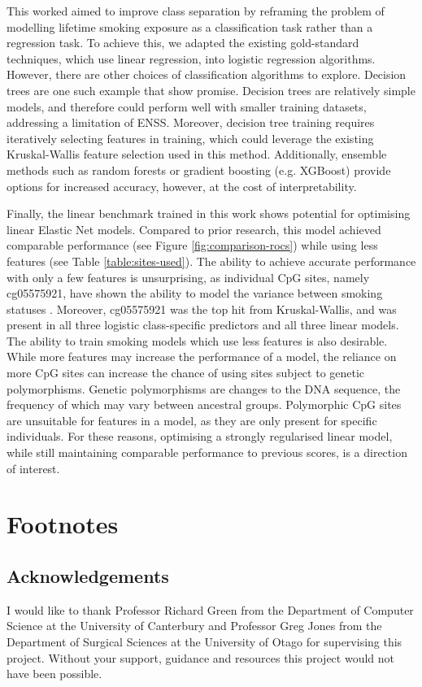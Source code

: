 \documentclass{article} %
\begin{document}
This worked aimed to improve class separation by reframing the problem of modelling lifetime smoking exposure as a classification task rather than a regression task. To achieve this, we adapted the existing gold-standard techniques, which use linear regression, into logistic regression algorithms. However, there are other choices of classification algorithms to explore. Decision trees are one such example that show promise. Decision trees are relatively simple models, and therefore could perform well with smaller training datasets, addressing a limitation of ENSS. Moreover, decision tree training requires iteratively selecting features in training, which could leverage the existing Kruskal-Wallis feature selection used in this method. Additionally, ensemble methods such as random forests or gradient boosting (e.g. XGBoost) provide options for increased accuracy, however, at the cost of interpretability.

Finally, the linear benchmark trained in this work shows potential for optimising linear Elastic Net models. Compared to prior research, this model achieved comparable performance (see Figure \ref{fig:comparison-rocs}) while using less features (see Table \ref{table:sites-used}). The ability to achieve accurate performance with only a few features is unsurprising, as individual CpG sites, namely cg05575921, have shown the ability to model the variance between smoking statuses \cite{reynolds2015dna}. Moreover, cg05575921 was the top hit from Kruskal-Wallis, and was present in all three logistic class-specific predictors and all three linear models. The ability to train smoking models which use less features is also desirable. While more features may increase the performance of a model, the reliance on more CpG sites can increase the chance of using sites subject to genetic polymorphisms. Genetic polymorphisms are changes to the DNA sequence, the frequency of which may vary between ancestral groups. Polymorphic CpG sites are unsuitable for features in a model, as they are only present for specific individuals. For these reasons, optimising a strongly regularised linear model, while still maintaining comparable performance to previous scores, is a direction of interest.

\section{Footnotes}
\subsection{Acknowledgements}
I would like to thank Professor Richard Green from the Department of Computer Science at the University of Canterbury and Professor Greg Jones from the Department of Surgical Sciences at the University of Otago for supervising this project. Without your support, guidance and resources this project would not have been possible.
\end{document}
